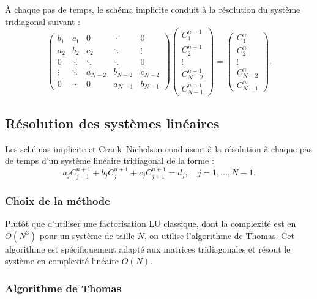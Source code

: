 \documentclass[12pt,a4paper]{article}
\begin{document}
À chaque pas de temps, le schéma implicite conduit à la résolution du système
tridiagonal suivant :
\[
\begin{pmatrix}
b_1 & c_1 & 0 & \cdots & 0 \\
a_2 & b_2 & c_2 & \ddots & \vdots \\
0 & \ddots & \ddots & \ddots & 0 \\
\vdots & \ddots & a_{N-2} & b_{N-2} & c_{N-2} \\
0 & \cdots & 0 & a_{N-1} & b_{N-1}
\end{pmatrix}
\begin{pmatrix}
C_1^{n+1} \\
C_2^{n+1} \\
\vdots \\
C_{N-2}^{n+1} \\
C_{N-1}^{n+1}
\end{pmatrix}
=
\begin{pmatrix}
C_1^n \\
C_2^n \\
\vdots \\
C_{N-2}^n \\
C_{N-1}^n
\end{pmatrix}.
\]



\subsection{Résolution des systèmes linéaires}

Les schémas implicite et Crank--Nicholson conduisent à la résolution à chaque pas de temps
d’un système linéaire tridiagonal de la forme :
\[
a_j C_{j-1}^{n+1} + b_j C_j^{n+1} + c_j C_{j+1}^{n+1} = d_j, \quad j = 1,\dots,N-1.
\]

\subsubsection*{Choix de la méthode}

Plutôt que d’utiliser une factorisation LU classique, dont la complexité est en 
$O(N^3)$ pour un système de taille $N$, on utilise l’algorithme de Thomas.  
Cet algorithme est spécifiquement adapté aux matrices tridiagonales et résout le
système en complexité linéaire $O(N)$.

\subsubsection*{Algorithme de Thomas}
\end{document}
